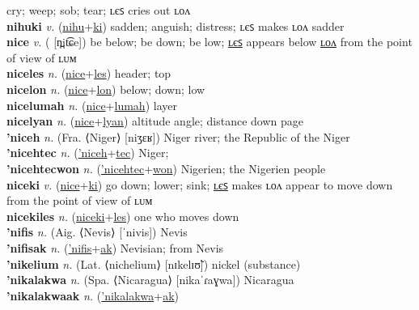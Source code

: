 cry; weep; sob; tear; ʟєꜱ cries out ʟᴏᴧ \label{nihucwelonkoki} \\
\textbf{nihuki} \textit{v.} (\hyperref[nihu]{nihu}+\hyperref[ki]{ki})
sadden; anguish; distress; ʟєꜱ makes ʟᴏᴧ sadder \label{nihuki} \\
\textbf{nice} \textit{v.} ( [n̪it͡ɕe])
be below; be down; be low; \hyperref[niceles]{ʟєꜱ} appears below \hyperref[nicelon]{ʟᴏᴧ} from the point of view of ʟᴜᴍ \label{nice} \\
\textbf{niceles} \textit{n.} (\hyperref[nice]{nice}+\hyperref[les]{les})
header; top \label{niceles} \\
\textbf{nicelon} \textit{n.} (\hyperref[nice]{nice}+\hyperref[lon]{lon})
below; down; low \label{nicelon} \\
\textbf{nicelumah} \textit{n.} (\hyperref[nice]{nice}+\hyperref[lumah]{lumah})
layer \label{nicelumah} \\
\textbf{nicelyan} \textit{n.} (\hyperref[nice]{nice}+\hyperref[lyan]{lyan})
altitude angle; distance down page \label{nicelyan} \\
\textbf{'niceh} \textit{n.} (Fra. ⟨Niger⟩ [niʒɛʁ])
Niger river; the Republic of the Niger \label{'niceh} \\
\textbf{'nicehtec} \textit{n.} (\hyperref['niceh]{'niceh}+\hyperref[tec]{tec})
Niger; \label{'nicehtec} \\
\textbf{'nicehtecwon} \textit{n.} (\hyperref['nicehtec]{'nicehtec}+\hyperref[won]{won})
Nigerien; the Nigerien people \label{'nicehtecwon} \\
\textbf{niceki} \textit{v.} (\hyperref[nice]{nice}+\hyperref[ki]{ki})
go down; lower; sink; \hyperref[nicekiles]{ʟєꜱ} makes ʟᴏᴧ appear to move down from the point of view of ʟᴜᴍ \label{niceki} \\
\textbf{nicekiles} \textit{n.} (\hyperref[niceki]{niceki}+\hyperref[les]{les})
one who moves down \label{nicekiles} \\
\textbf{'nifis} \textit{n.} (Aig. ⟨Nevis⟩ [ˈnivis])
Nevis \label{'nifis} \\
\textbf{'nifisak} \textit{n.} (\hyperref['nifis]{'nifis}+\hyperref[ak]{ak})
Nevisian; from Nevis \label{'nifisak} \\
\textbf{'nikelium} \textit{n.} (Lat. ⟨nichelium⟩ [nɪkelɪʊ̃])
nickel (substance) \label{'nikelium} \\
\textbf{'nikalakwa} \textit{n.} (Spa. ⟨Nicaragua⟩ [nikaˈɾaɣwa])
Nicaragua \label{'nikalakwa} \\
\textbf{'nikalakwaak} \textit{n.} (\hyperref['nikalakwa]{'nikalakwa}+\hyperref[ak]{ak})
